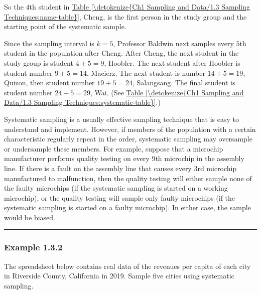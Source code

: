 \documentclass[letterpaper,10pt,english]{jupyterBook}
\begin{document}
\sphinxAtStartPar
So the \(4\)th student in \hyperref[\detokenize{Ch1 Sampling and Data/1.3 Sampling Techniques:name-table}]{Table \ref{\detokenize{Ch1 Sampling and Data/1.3 Sampling Techniques:name-table}}}, Cheng, is the first person in the study group and the starting point of the systematic sample.

\sphinxAtStartPar
Since the sampling interval is \(k = 5\), Professor Baldwin next samples every \(5\)th student in the population after Cheng. After Cheng, the next student in the study group is student \(4 + 5 = 9\), Hoobler. The next student after Hoobler is student number \(9 + 5 = 14\), Macierz. The next student is number \(14 + 5 = 19\), Quizon, then student number \(19 + 5 = 24\), Salangsang. The final student is student number \(24 + 5 = 29\), Wai. (See \hyperref[\detokenize{Ch1 Sampling and Data/1.3 Sampling Techniques:systematic-table}]{Table \ref{\detokenize{Ch1 Sampling and Data/1.3 Sampling Techniques:systematic-table}}}.)

\sphinxAtStartPar
Systematic sampling is a usually effective sampling technique that is easy to understand and implement. However, if members of the population with a certain characteristic regularly repeat in the order, systematic sampling may over\sphinxhyphen{}sample or under\sphinxhyphen{}sample these members. For example, suppose that a microchip manufacturer performs quality testing on every \(9\)th microchip in the assembly line. If there is a fault on the assembly line that causes every \(3\)rd microchip manufactured to malfunction, then the quality testing will either sample none of the faulty microchips (if the systematic sampling is started on a working microchip), or the quality testing will sample only faulty microchips (if the systematic sampling is started on a faulty microchip). In either case, the sample would be biased.


\bigskip\hrule\bigskip



\subsubsection{Example 1.3.2}
\label{\detokenize{Ch1 Sampling and Data/1.3 Sampling Techniques:example-1-3-2}}
\sphinxAtStartPar
The spreadsheet below contains real data of the revenues per capita of each city in Riverside County, California in 2019. Sample five cities using systematic sampling.
\end{document}
